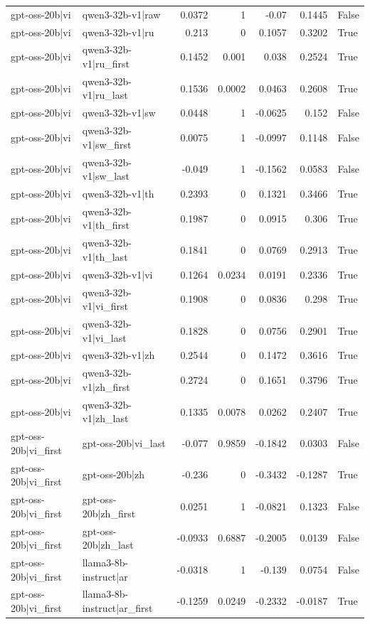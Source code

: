 \begin{table}
\begin{tabular}{l l r r r r l}
gpt-oss-20b|vi & qwen3-32b-v1|raw & 0.0372 & 1 & -0.07 & 0.1445 & False \\
gpt-oss-20b|vi & qwen3-32b-v1|ru & 0.213 & 0 & 0.1057 & 0.3202 & True \\
gpt-oss-20b|vi & qwen3-32b-v1|ru_first & 0.1452 & 0.001 & 0.038 & 0.2524 & True \\
gpt-oss-20b|vi & qwen3-32b-v1|ru_last & 0.1536 & 0.0002 & 0.0463 & 0.2608 & True \\
gpt-oss-20b|vi & qwen3-32b-v1|sw & 0.0448 & 1 & -0.0625 & 0.152 & False \\
gpt-oss-20b|vi & qwen3-32b-v1|sw_first & 0.0075 & 1 & -0.0997 & 0.1148 & False \\
gpt-oss-20b|vi & qwen3-32b-v1|sw_last & -0.049 & 1 & -0.1562 & 0.0583 & False \\
gpt-oss-20b|vi & qwen3-32b-v1|th & 0.2393 & 0 & 0.1321 & 0.3466 & True \\
gpt-oss-20b|vi & qwen3-32b-v1|th_first & 0.1987 & 0 & 0.0915 & 0.306 & True \\
gpt-oss-20b|vi & qwen3-32b-v1|th_last & 0.1841 & 0 & 0.0769 & 0.2913 & True \\
gpt-oss-20b|vi & qwen3-32b-v1|vi & 0.1264 & 0.0234 & 0.0191 & 0.2336 & True \\
gpt-oss-20b|vi & qwen3-32b-v1|vi_first & 0.1908 & 0 & 0.0836 & 0.298 & True \\
gpt-oss-20b|vi & qwen3-32b-v1|vi_last & 0.1828 & 0 & 0.0756 & 0.2901 & True \\
gpt-oss-20b|vi & qwen3-32b-v1|zh & 0.2544 & 0 & 0.1472 & 0.3616 & True \\
gpt-oss-20b|vi & qwen3-32b-v1|zh_first & 0.2724 & 0 & 0.1651 & 0.3796 & True \\
gpt-oss-20b|vi & qwen3-32b-v1|zh_last & 0.1335 & 0.0078 & 0.0262 & 0.2407 & True \\
gpt-oss-20b|vi_first & gpt-oss-20b|vi_last & -0.077 & 0.9859 & -0.1842 & 0.0303 & False \\
gpt-oss-20b|vi_first & gpt-oss-20b|zh & -0.236 & 0 & -0.3432 & -0.1287 & True \\
gpt-oss-20b|vi_first & gpt-oss-20b|zh_first & 0.0251 & 1 & -0.0821 & 0.1323 & False \\
gpt-oss-20b|vi_first & gpt-oss-20b|zh_last & -0.0933 & 0.6887 & -0.2005 & 0.0139 & False \\
gpt-oss-20b|vi_first & llama3-8b-instruct|ar & -0.0318 & 1 & -0.139 & 0.0754 & False \\
gpt-oss-20b|vi_first & llama3-8b-instruct|ar_first & -0.1259 & 0.0249 & -0.2332 & -0.0187 & True \\

\end{tabular}
\end{table}
